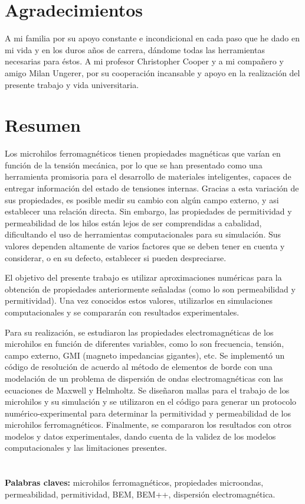 \documentclass[12pt,letterpaper]{report}
\numberwithin{equation}{section}
\begin{document}
\chapter*{Agradecimientos}
A mi familia por su apoyo constante e incondicional en cada paso que he dado en mi vida y en los duros años de carrera, dándome todas las herramientas necesarias para éstos. A mi profesor Christopher Cooper y a mi compañero y amigo Milan Ungerer, por su cooperación incansable y apoyo en la realización del presente trabajo y vida universitaria. 

\pagebreak
\chapter*{Resumen}

Los microhilos ferromagnéticos tienen propiedades magnéticas que varían en función de la tensión mecánica, por lo que se han presentado como una herramienta promisoria para el desarrollo de materiales inteligentes, capaces de entregar información del estado de tensiones internas. Gracias a esta variación de sus propiedades, es posible medir su cambio con algún campo externo, y asi establecer una relación directa. Sin embargo, las propiedades de permitividad y permeabilidad de los hilos están lejos de ser comprendidas a cabalidad, dificultando el uso de herramientas computacionales para su simulación. Sus valores dependen altamente de varios factores que se deben tener en cuenta y considerar, o en su defecto, establecer si pueden despreciarse. 

El objetivo del presente trabajo es utilizar aproximaciones numéricas para la obtención de propiedades anteriormente señaladas (como lo son permeabilidad y permitividad). Una vez conocidos estos valores, utilizarlos en simulaciones computacionales y se compararán con resultados experimentales.

Para su realización, se estudiaron las propiedades electromagnéticas de los microhilos en función de diferentes variables, como lo son frecuencia, tensión, campo externo, GMI (magneto impedancias gigantes), etc. Se implementó un código de resolución de acuerdo al método de elementos de borde con una modelación de un problema de dispersión de ondas electromagnéticas con las ecuaciones de Maxwell y Helmholtz. Se diseñaron mallas para el trabajo de los microhilos y su simulación y se utilizaron en el código para generar un protocolo numérico-experimental para determinar la permitividad y permeabilidad de los microhilos ferromagnéticos. Finalmente, se compararon los resultados con otros modelos y datos experimentales, dando cuenta de la validez de los modelos computacionales y las limitaciones presentes.
 \\
 \\
 \\
\noindent \textbf{Palabras claves:} microhilos ferromagnéticos, propiedades microondas, permeabilidad, permitividad, BEM, BEM++, dispersión electromagnética.
\end{document}
